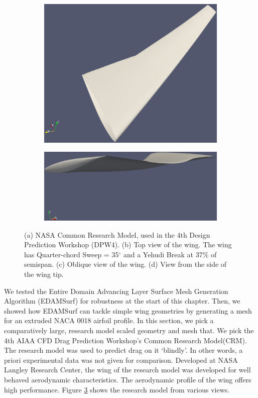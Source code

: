 \begin{figure}[!hbt]
\begin{subfigure}{0.45\textwidth}
		\centering
		\includegraphics[width=0.96\linewidth]{img/r/dpw4/wingOblique.eps}
		\caption{}
		\label{wingOblique}
	\end{subfigure}
	\begin{subfigure}{\textwidth}
		\centering
		\includegraphics[width=0.88\linewidth,trim={0 8cm 0 5cm},clip]{img/r/dpw4/wingTip.eps}
		\caption{}
		\label{wingTip}
	\end{subfigure}
	\caption[Various views of NASA Common Research Model(CRM) airplane.]{(a) NASA Common Research Model, used in the 4th Design Prediction Workshop (DPW4). (b) Top view of the wing. The wing has Quarter-chord Sweep = 35$^\circ$ and a Yehudi Break at 37$\%$ of semispan. (c) Oblique view of the wing. (d) View from the side of the wing tip.}
	\label{fig-dpw4}
\end{figure}

We tested the Entire Domain Advancing Layer Surface Mesh Generation Algorithm (EDAMSurf) for robustness at the start of this chapter. Then, we showed how EDAMSurf can tackle simple wing geometries by generating a mesh for an extruded NACA 0018 airfoil profile. In this section, we pick a comparatively large, research model scaled geometry and mesh that. We pick the 4th AIAA CFD Drag Prediction Workshop's Common Research Model(CRM)\cite{vassberg2008development}. The research model was used to predict drag on it `blindly'. In other words, a priori experimental data was not given for comparison. Developed at NASA Langley Research Center, the wing of the research model was developed for well behaved aerodynamic characteristics. The aerodynamic profile of the wing offers high performance. Figure \ref{fig-dpw4} shows the research model from various views.

